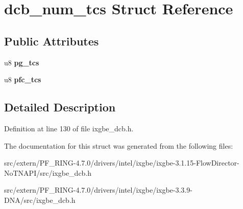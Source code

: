 \hypertarget{structdcb__num__tcs}{
\section{dcb\_\-num\_\-tcs Struct Reference}
\label{structdcb__num__tcs}
}
\subsection*{Public Attributes}
\begin{DoxyCompactItemize}
\item 
\hypertarget{structdcb__num__tcs_a512be8c4d7f56539b4f0259ce0385271}{
u8 {\bfseries pg\_\-tcs}}
\label{structdcb__num__tcs_a512be8c4d7f56539b4f0259ce0385271}

\item 
\hypertarget{structdcb__num__tcs_a22eed8c6a7424ee161c22efc94d42af8}{
u8 {\bfseries pfc\_\-tcs}}
\label{structdcb__num__tcs_a22eed8c6a7424ee161c22efc94d42af8}

\end{DoxyCompactItemize}


\subsection{Detailed Description}


Definition at line 130 of file ixgbe\_\-dcb.h.



The documentation for this struct was generated from the following files:\begin{DoxyCompactItemize}
\item 
src/extern/PF\_\-RING-\/4.7.0/drivers/intel/ixgbe/ixgbe-\/3.1.15-\/FlowDirector-\/NoTNAPI/src/ixgbe\_\-dcb.h\item 
src/extern/PF\_\-RING-\/4.7.0/drivers/intel/ixgbe/ixgbe-\/3.3.9-\/DNA/src/ixgbe\_\-dcb.h\end{DoxyCompactItemize}
